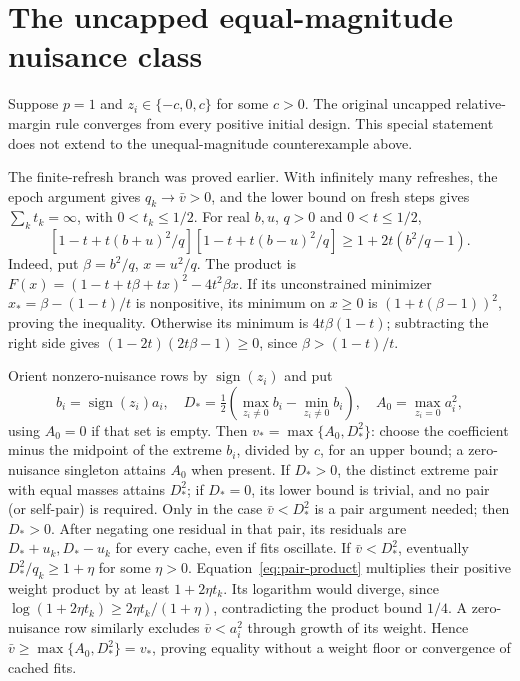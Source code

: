 \section{The uncapped equal-magnitude nuisance class}
Suppose $p=1$ and $z_i\in\{-c,0,c\}$ for some $c>0$. The original uncapped relative-margin rule converges from every positive initial design. This special statement does not extend to the unequal-magnitude counterexample above.

The finite-refresh branch was proved earlier. With infinitely many refreshes, the epoch argument gives $q_k\to\bar v>0$, and the lower bound on fresh steps gives $\sum_k t_k=\infty$, with $0<t_k\le1/2$.
For real $b,u$, $q>0$ and $0<t\le1/2$,
\begin{equation}\label{eq:pair-product}
 [1-t+t(b+u)^2/q][1-t+t(b-u)^2/q]\ge1+2t(b^2/q-1).
\end{equation}
Indeed, put $\beta=b^2/q$, $x=u^2/q$. The product is
$F(x)=(1-t+t\beta+tx)^2-4t^2\beta x$.
If its unconstrained minimizer $x_*=\beta-(1-t)/t$ is nonpositive, its minimum on $x\ge0$ is $(1+t(\beta-1))^2$, proving the inequality.
Otherwise its minimum is $4t\beta(1-t)$; subtracting the right side gives
$(1-2t)(2t\beta-1)\ge0$, since $\beta>(1-t)/t$.

Orient nonzero-nuisance rows by $\operatorname{sign}(z_i)$ and put
\[
 b_i=\operatorname{sign}(z_i)a_i,\quad
 D_*=\tfrac12(\max_{z_i\ne0}b_i-\min_{z_i\ne0}b_i),\quad
 A_0=\max_{z_i=0}a_i^2,
\]
using $A_0=0$ if that set is empty. Then $v_*=\max\{A_0,D_*^2\}$:
choose the coefficient minus the midpoint of the extreme $b_i$, divided by $c$, for an upper bound; a zero-nuisance singleton attains $A_0$ when present. If $D_*>0$, the distinct extreme pair with equal masses attains $D_*^2$; if $D_*=0$, its lower bound is trivial, and no pair (or self-pair) is required.
Only in the case $\bar v<D_*^2$ is a pair argument needed; then $D_*>0$. After negating one residual in that pair, its residuals are $D_*+u_k,D_*-u_k$ for every cache, even if fits oscillate.
If $\bar v<D_*^2$, eventually $D_*^2/q_k\ge1+\eta$ for some $\eta>0$.
Equation~\eqref{eq:pair-product} multiplies their positive weight product by at least $1+2\eta t_k$. Its logarithm would diverge, since
$\log(1+2\eta t_k)\ge2\eta t_k/(1+\eta)$, contradicting the product bound $1/4$.
A zero-nuisance row similarly excludes $\bar v<a_i^2$ through growth of its weight.
Hence $\bar v\ge\max\{A_0,D_*^2\}=v_*$, proving equality without a weight floor or convergence of cached fits.

